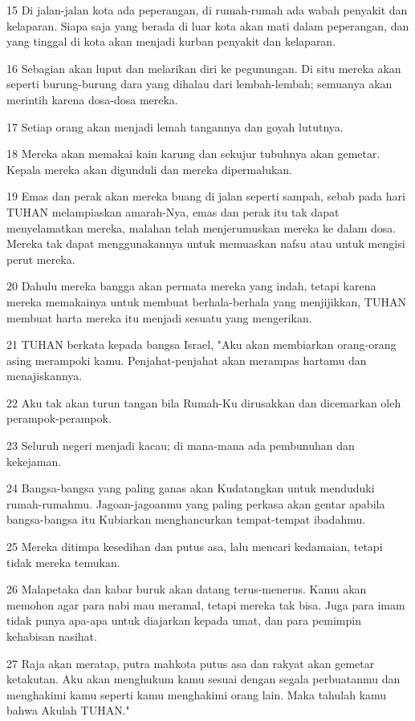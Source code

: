 \par 15 Di jalan-jalan kota ada peperangan, di rumah-rumah ada wabah penyakit dan kelaparan. Siapa saja yang berada di luar kota akan mati dalam peperangan, dan yang tinggal di kota akan menjadi kurban penyakit dan kelaparan.
\par 16 Sebagian akan luput dan melarikan diri ke pegunungan. Di situ mereka akan seperti burung-burung dara yang dihalau dari lembah-lembah; semuanya akan merintih karena dosa-dosa mereka.
\par 17 Setiap orang akan menjadi lemah tangannya dan goyah lututnya.
\par 18 Mereka akan memakai kain karung dan sekujur tubuhnya akan gemetar. Kepala mereka akan digunduli dan mereka dipermalukan.
\par 19 Emas dan perak akan mereka buang di jalan seperti sampah, sebab pada hari TUHAN melampiaskan amarah-Nya, emas dan perak itu tak dapat menyelamatkan mereka, malahan telah menjerumuskan mereka ke dalam dosa. Mereka tak dapat menggunakannya untuk memuaskan nafsu atau untuk mengisi perut mereka.
\par 20 Dahulu mereka bangga akan permata mereka yang indah, tetapi karena mereka memakainya untuk membuat berhala-berhala yang menjijikkan, TUHAN membuat harta mereka itu menjadi sesuatu yang mengerikan.
\par 21 TUHAN berkata kepada bangsa Israel, "Aku akan membiarkan orang-orang asing merampoki kamu. Penjahat-penjahat akan merampas hartamu dan menajiskannya.
\par 22 Aku tak akan turun tangan bila Rumah-Ku dirusakkan dan dicemarkan oleh perampok-perampok.
\par 23 Seluruh negeri menjadi kacau; di mana-mana ada pembunuhan dan kekejaman.
\par 24 Bangsa-bangsa yang paling ganas akan Kudatangkan untuk menduduki rumah-rumahmu. Jagoan-jagoanmu yang paling perkasa akan gentar apabila bangsa-bangsa itu Kubiarkan menghancurkan tempat-tempat ibadahmu.
\par 25 Mereka ditimpa kesedihan dan putus asa, lalu mencari kedamaian, tetapi tidak mereka temukan.
\par 26 Malapetaka dan kabar buruk akan datang terus-menerus. Kamu akan memohon agar para nabi mau meramal, tetapi mereka tak bisa. Juga para imam tidak punya apa-apa untuk diajarkan kepada umat, dan para pemimpin kehabisan nasihat.
\par 27 Raja akan meratap, putra mahkota putus asa dan rakyat akan gemetar ketakutan. Aku akan menghukum kamu sesuai dengan segala perbuatanmu dan menghakimi kamu seperti kamu menghakimi orang lain. Maka tahulah kamu bahwa Akulah TUHAN."

